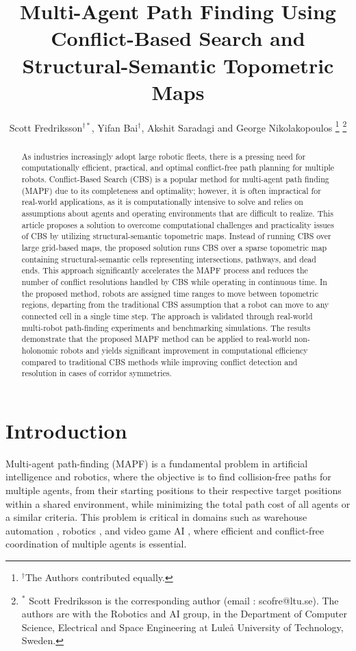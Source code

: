 \documentclass[letterpaper, 10 pt, conference]{ieeeconf}  %
\title{\LARGE \bf
Multi-Agent Path Finding Using Conflict-Based Search and Structural-Semantic Topometric Maps
}
\author{Scott Fredriksson$^{\dagger*}$, Yifan Bai$^\dagger$, Akshit Saradagi and George Nikolakopoulos%
\thanks{$^{\dagger}$The Authors contributed equally.}
\thanks{$^*$ Scott Fredriksson is the corresponding author (email : scofre@ltu.se). The authors are with the Robotics and AI group, in the Department of Computer Science, Electrical and Space Engineering at Luleå University of Technology, Sweden.}%
}
\begin{document}
\newcommand{\customcomment}[1]{ // #1}
\maketitle

\begin{abstract} As industries increasingly adopt large robotic fleets, there is a pressing need for computationally efficient, practical, and optimal conflict-free path planning for multiple robots. Conflict-Based Search (CBS) is a popular method for multi-agent path finding (MAPF) due to its completeness and optimality; however, it is often impractical for real-world applications, as it is computationally intensive to solve and relies on assumptions about agents and operating environments that are difficult to realize. 
This article proposes a solution to overcome computational challenges and practicality issues of CBS by utilizing structural-semantic topometric maps. Instead of running CBS over large grid-based maps, the proposed solution runs CBS over a sparse topometric map containing structural-semantic cells representing intersections, pathways, and dead ends. This approach significantly accelerates the MAPF process and reduces the number of conflict resolutions handled by CBS while operating in continuous time. 
In the proposed method, robots are assigned time ranges to move between topometric regions, departing from the traditional CBS assumption that a robot can move to any connected cell in a single time step. The approach is validated through real-world multi-robot path-finding experiments and benchmarking simulations. The results demonstrate that the proposed MAPF method can be applied to real-world non-holonomic robots and yields significant improvement in computational efficiency compared to traditional CBS methods while improving conflict detection and resolution in cases of corridor symmetries.  
\end{abstract}

\section{Introduction}
Multi-agent path-finding (MAPF)\cite{stern2019multi} is a fundamental problem in artificial intelligence and robotics, where the objective is to find collision-free paths for multiple agents, from their starting positions to their respective target positions within a shared environment, while minimizing the total path cost of all agents or a similar criteria. This problem is critical in domains such as warehouse automation \cite{ma2019lifelong}, robotics \cite{honig2018trajectory}, and video game AI \cite{stern2019multi}, where efficient and conflict-free coordination of multiple agents is essential.
\end{document}
